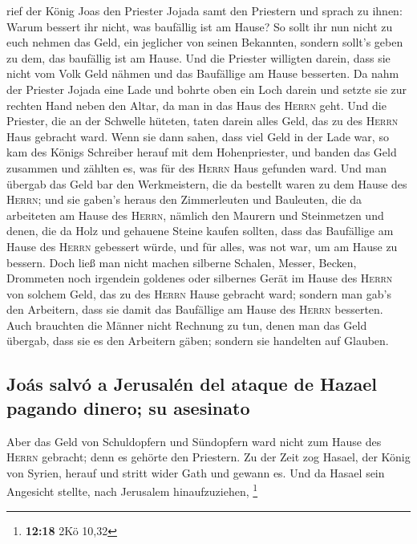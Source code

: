  rief der König Joas den Priester Jojada samt den
Priestern und sprach zu ihnen: Warum bessert ihr nicht, was baufällig
ist am Hause? So sollt ihr nun nicht zu euch nehmen das Geld, ein
jeglicher von seinen Bekannten, sondern sollt's geben zu dem, das
baufällig ist am Hause.  Und die Priester willigten
darein, dass sie nicht vom Volk Geld nähmen und das Baufällige am Hause
besserten.  Da nahm der Priester Jojada eine Lade und
bohrte oben ein Loch darein und setzte sie zur rechten Hand neben den
Altar, da man in das Haus des \textsc{Herrn} geht. Und die Priester, die
an der Schwelle hüteten, taten darein alles Geld, das zu des
\textsc{Herrn} Haus gebracht ward.  Wenn sie dann sahen,
dass viel Geld in der Lade war, so kam des Königs Schreiber herauf mit
dem Hohenpriester, und banden das Geld zusammen und zählten es, was für
des \textsc{Herrn} Haus gefunden ward.  Und man übergab
das Geld bar den Werkmeistern, die da bestellt waren zu dem Hause des
\textsc{Herrn}; und sie gaben's heraus den Zimmerleuten und Bauleuten,
die da arbeiteten am Hause des \textsc{Herrn},  nämlich
den Maurern und Steinmetzen und denen, die da Holz und gehauene Steine
kaufen sollten, dass das Baufällige am Hause des \textsc{Herrn}
gebessert würde, und für alles, was not war, um am Hause zu bessern.
 Doch ließ man nicht machen silberne Schalen, Messer,
Becken, Drommeten noch irgendein goldenes oder silbernes Gerät im Hause
des \textsc{Herrn} von solchem Geld, das zu des \textsc{Herrn} Hause
gebracht ward;  sondern man gab's den Arbeitern, dass sie
damit das Baufällige am Hause des \textsc{Herrn} besserten.
 Auch brauchten die Männer nicht Rechnung zu tun, denen
man das Geld übergab, dass sie es den Arbeitern gäben; sondern sie
handelten auf Glauben.

\hypertarget{jouxe1s-salvuxf3-a-jerusaluxe9n-del-ataque-de-hazael-pagando-dinero-su-asesinato}{%
\subsection{Joás salvó a Jerusalén del ataque de Hazael pagando dinero;
su
asesinato}\label{jouxe1s-salvuxf3-a-jerusaluxe9n-del-ataque-de-hazael-pagando-dinero-su-asesinato}}

 Aber das Geld von Schuldopfern und Sündopfern ward nicht
zum Hause des \textsc{Herrn} gebracht; denn es gehörte den Priestern.
 Zu der Zeit zog Hasael, der König von Syrien, herauf und
stritt wider Gath und gewann es. Und da Hasael sein Angesicht stellte,
nach Jerusalem hinaufzuziehen, \footnote{\textbf{12:18} 2Kö 10,32}

